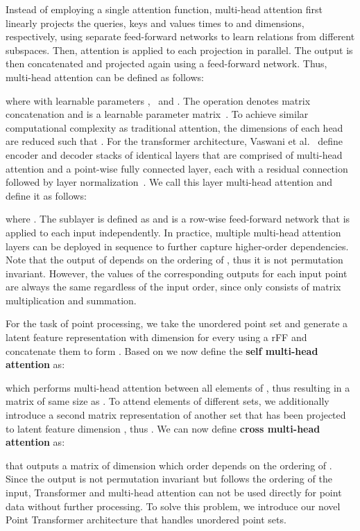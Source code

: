 \documentclass{ieeeaccess}
\begin{document}
Instead of employing a single attention function, multi-head attention first linearly projects the queries, keys and values   times to  and  dimensions, respectively, using separate feed-forward networks to learn relations from different subspaces. Then, attention is applied to each projection in parallel. The output is then concatenated and projected again using a feed-forward network. Thus, multi-head attention can be defined as follows:

where \mbox{} with learnable parameters \mbox{, } and \mbox{.}
The  operation denotes matrix concatenation and  is a learnable parameter matrix~\cite{vaswani2017attention}. To achieve similar computational complexity as traditional attention, the dimensions of each head  are reduced such that . 
For the transformer architecture, Vaswani et al.~\cite{vaswani2017attention} define encoder and decoder stacks of identical layers that are comprised of multi-head attention and a point-wise fully connected layer, each with a residual connection followed by layer normalization~\cite{ba2016layer}. We call this layer multi-head attention and define it as follows:

where . 
The sublayer  is defined as  and  is a row-wise feed-forward network that is applied to each input independently. In practice, multiple multi-head attention layers can be deployed in sequence to further capture higher-order dependencies. Note that the output of  depends on the ordering of , thus it is not permutation invariant. However, the values of the corresponding outputs for each input point are always the same regardless of the input order, since  only consists of matrix multiplication and summation.

For the task of point processing, we take the unordered point set  and generate a latent feature representation  with dimension  for every  using a rFF and concatenate them to form . Based on  we now define the \textbf{self multi-head attention} as:

which performs multi-head attention between all elements of , thus resulting in a matrix of same size as . To attend elements of different sets, we additionally introduce a second matrix representation  of another set \mbox{} that has been projected to latent feature dimension , thus . We can now define \textbf{cross multi-head attention} as:

that outputs a matrix of dimension  which order depends on the ordering of . Since the output is not permutation invariant but follows the ordering of the input, Transformer and multi-head attention can not be used directly for point data without further processing. To solve this problem, we introduce our novel Point Transformer architecture that handles unordered point sets. 
\end{document}
